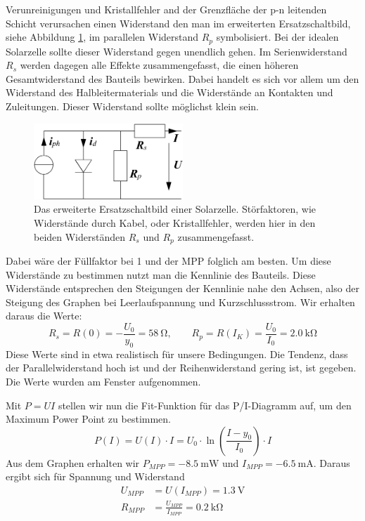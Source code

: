 Verunreinigungen und Kristallfehler and der Grenzfläche der p-n leitenden
Schicht verursachen einen Widerstand den man im erweiterten Ersatzschaltbild,
siehe Abbildung \ref{solarschalt}, im parallelen Widerstand $R_p$ symbolisiert.
Bei der idealen Solarzelle sollte dieser Widerstand gegen unendlich gehen.
Im Serienwiderstand $R_s$ werden dagegen alle Effekte zusammengefasst, die einen
höheren Gesamtwiderstand des Bauteils bewirken. Dabei handelt es sich vor allem
um den Widerstand des Halbleitermaterials und die Widerstände an Kontakten und
Zuleitungen. Dieser Widerstand sollte möglichst klein sein.
\begin{figure}[h]
	\centering
	\includegraphics[width=0.5\textwidth]{Abb/solarschalt.png}
	\caption{Das erweiterte Ersatzschaltbild einer Solarzelle. Störfaktoren, wie
			 Widerstände durch Kabel, oder Kristallfehler, werden hier in den
			 beiden Widerständen $R_s$ und $R_p$ zusammengefasst.}
	\label{solarschalt}
\end{figure}
Dabei wäre der Füllfaktor bei 1 und der MPP folglich am besten.
Um diese Widerstände zu bestimmen nutzt man die Kennlinie des Bauteils.
Diese Widerstände entsprechen den Steigungen der Kennlinie nahe den Achsen, also der Steigung des Graphen bei Leerlaufspannung und Kurzschlussstrom.
Wir erhalten daraus die Werte:
\[
R_s=R(0)=-\frac{U_0}{y_0}=\SI{58}{\ohm}, \qquad
R_p=R(I_K)=\frac{U_0}{I_0}=\SI{2,0}{\kilo \ohm}
\]
Diese Werte sind in etwa realistisch für unsere Bedingungen. Die Tendenz, dass der Parallelwiderstand hoch ist und der Reihenwiderstand gering ist, ist gegeben. Die Werte wurden am Fenster aufgenommen.

Mit $P=UI$ stellen wir nun die Fit-Funktion für das P/I-Diagramm auf, um den Maximum Power Point zu bestimmen.
\[
	P(I)=U(I) \cdot I=U_0 \cdot \ln \left( \frac{I-y_0}{I_0} \right) \cdot I
\]
Aus dem Graphen erhalten wir $P_{MPP}= \SI{-8,5}{\milli \watt}$ und $I_{MPP} = \SI{-6,5}{\milli \ampere}$.
Daraus ergibt sich für Spannung und Widerstand
\begin{align*}
	U_{MPP} &= U(I_{MPP}) = \SI{1,3}{\volt} \\
	R_{MPP} &= \frac{U_{MPP}}{I_{MPP}} = \SI{0,2}{\kilo \ohm}
\end{align*}

